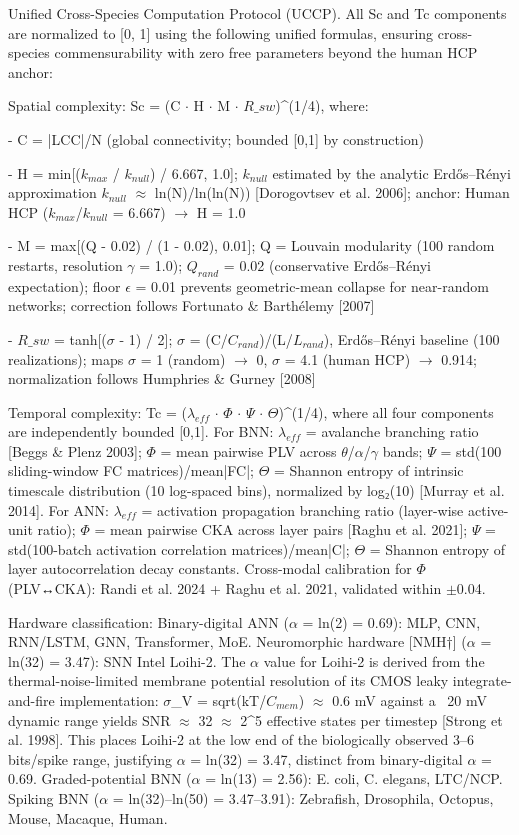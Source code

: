 \documentclass[a4paper,12pt]{article}
\begin{document}
Unified Cross-Species Computation Protocol (UCCP). All Sc and Tc components are normalized to [0, 1] using the following unified formulas, ensuring cross-species commensurability with zero free parameters beyond the human HCP anchor:


Spatial complexity: Sc = (C $\cdot$ H $\cdot$ M $\cdot$ $R\_{sw}$)^(1/4), where:


- C = |LCC|/N (global connectivity; bounded [0,1] by construction)


- H = min[($k_{max}$ / $k_{null}$) / 6.667, 1.0]; $k_{null}$ estimated by the analytic Erdős--Rényi approximation $k_{null}$ $\approx$ ln(N)/ln(ln(N)) [Dorogovtsev et al. 2006]; anchor: Human HCP ($k_{max}$/$k_{null}$ = 6.667) $\rightarrow$ H = 1.0


- M = max[(Q - 0.02) / (1 - 0.02), 0.01]; Q = Louvain modularity (100 random restarts, resolution $\gamma$ = 1.0); $Q_{rand}$ = 0.02 (conservative Erdős--Rényi expectation); floor $\epsilon$ = 0.01 prevents geometric-mean collapse for near-random networks; correction follows Fortunato \& Barthélemy [2007]


- $R\_{sw}$ = tanh[($\sigma$ - 1) / 2]; $\sigma$ = (C/$C_{rand}$)/(L/$L_{rand}$), Erdős--Rényi baseline (100 realizations); maps $\sigma$ = 1 (random) $\rightarrow$ 0, $\sigma$ = 4.1 (human HCP) $\rightarrow$ 0.914; normalization follows Humphries \& Gurney [2008]


Temporal complexity: Tc = ($\lambda_{eff}$ $\cdot$ $\Phi$ $\cdot$ $\Psi$ $\cdot$ $\Theta$)^(1/4), where all four components are independently bounded [0,1]. For BNN: $\lambda_{eff}$ = avalanche branching ratio [Beggs \& Plenz 2003]; $\Phi$ = mean pairwise PLV across $\theta$/$\alpha$/$\gamma$ bands; $\Psi$ = std(100 sliding-window FC matrices)/mean|FC|; $\Theta$ = Shannon entropy of intrinsic timescale distribution (10 log-spaced bins), normalized by log₂(10) [Murray et al. 2014]. For ANN: $\lambda_{eff}$ = activation propagation branching ratio (layer-wise active-unit ratio); $\Phi$ = mean pairwise CKA across layer pairs [Raghu et al. 2021]; $\Psi$ = std(100-batch activation correlation matrices)/mean|C|; $\Theta$ = Shannon entropy of layer autocorrelation decay constants. Cross-modal calibration for $\Phi$ (PLV↔CKA): Randi et al. 2024 + Raghu et al. 2021, validated within $\pm$0.04.


Hardware classification: Binary-digital ANN ($\alpha$ = ln(2) = 0.69): MLP, CNN, RNN/LSTM, GNN, Transformer, MoE. Neuromorphic hardware [NMH†] ($\alpha$ = ln(32) = 3.47): SNN Intel Loihi-2. The $\alpha$ value for Loihi-2 is derived from the thermal-noise-limited membrane potential resolution of its CMOS leaky integrate-and-fire implementation: $\sigma$_V = sqrt(kT/$C_{mem}$) $\approx$ 0.6 mV against a ~20 mV dynamic range yields SNR $\approx$ 32 $\approx$ 2^5 effective states per timestep [Strong et al. 1998]. This places Loihi-2 at the low end of the biologically observed 3--6 bits/spike range, justifying $\alpha$ = ln(32) = 3.47, distinct from binary-digital $\alpha$ = 0.69. Graded-potential BNN ($\alpha$ = ln(13) = 2.56): E. coli, C. elegans, LTC/NCP. Spiking BNN ($\alpha$ = ln(32)--ln(50) = 3.47--3.91): Zebrafish, Drosophila, Octopus, Mouse, Macaque, Human.
\end{document}
